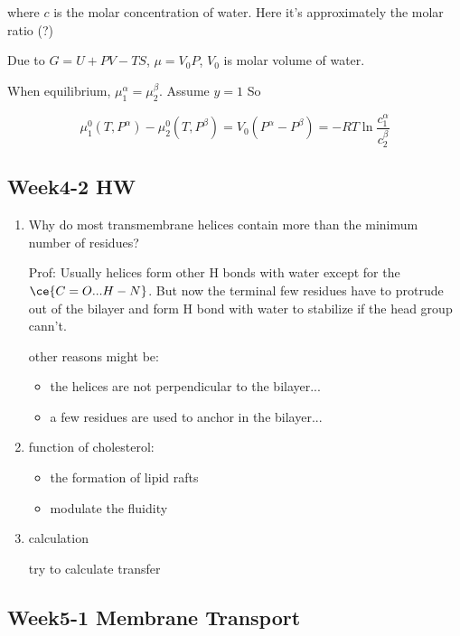 \documentclass[]{article}
\begin{document}
where \(c\) is the molar concentration of water. Here it's approximately
the molar ratio (?)

Due to \(G=U+PV-TS\), \(\mu=V_0P\), \(V_0\) is molar volume of water.

When equilibrium, \(\mu_1^\alpha=\mu_2^\beta\). Assume \(y=1\) So

\[\mu_1^0(T,P^\alpha)-\mu_2^0(T,P^\beta)=V_0(P^\alpha-P^\beta)=-RT\ln\dfrac{c_1^\alpha}{c_2^\beta}\]

\hypertarget{week4-2-hw}{%
\subsection{Week4-2 HW}\label{week4-2-hw}}

\begin{enumerate}
\def\labelenumi{\arabic{enumi}.}
\item
  Why do most transmembrane helices contain more than the minimum number
  of residues?

  Prof: Usually helices form other H bonds with water except for the
  \(\ce{C=O...H-N}\). But now the terminal few residues have to protrude
  out of the bilayer and form H bond with water to stabilize if the head
  group cann't.

  other reasons might be:

  \begin{itemize}
  \item
    the helices are not perpendicular to the bilayer...
  \item
    a few residues are used to anchor in the bilayer...
  \end{itemize}
\item
  function of cholesterol:

  \begin{itemize}
  \item
    the formation of lipid rafts
  \item
    modulate the fluidity
  \end{itemize}
\item
  calculation

  try to calculate transfer
\end{enumerate}

\hypertarget{week5-1-membrane-transport}{%
\subsection{Week5-1 Membrane
Transport}\label{week5-1-membrane-transport}}
\end{document}
